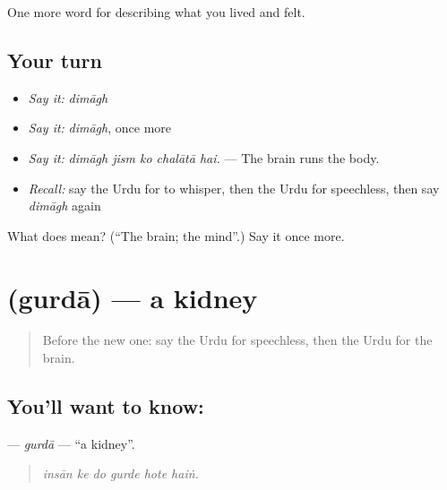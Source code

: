 \begin{grammarlens}[title={What you've built}]
One more word for describing what you lived and felt.
\end{grammarlens}

\subsection*{Your turn}
\begin{itemize}
\raggedright
  \item \emph{Say it:} \emph{dimāgh}
  \item \emph{Say it:} \emph{dimāgh}, once more
  \item \emph{Say it:} \emph{dimāgh jism ko chalātā hai.} — The brain runs the body.
  \item \emph{Recall:} say the Urdu for to whisper, then the Urdu for speechless, then say \emph{dimāgh} again
\end{itemize}

\begin{tcolorbox}[breakable,colback=teal!4,colframe=teal!35!black,title={Before you move on}]
What does  mean? (\textquotedblleft{}The brain; the mind\textquotedblright{}.) Say it once more.
\end{tcolorbox}
\section[\texorpdfstring{\ur{گردہ} (gurdā)}{گردہ (gurdā)}]{ (gurdā) — a kidney}

\label{lesson:UR-C464-gurda}



\begin{quote}
Before the new one: say the Urdu for speechless, then the Urdu for the brain.
\end{quote}

\subsection*{You'll want to know: }
\textbf{} — \emph{gurdā} — \textquotedblleft{}a kidney\textquotedblright{}.

\begin{quote}
     
\end{quote}

\begin{quote}
\emph{insān ke do gurde hote haiṅ.}
\end{quote}

